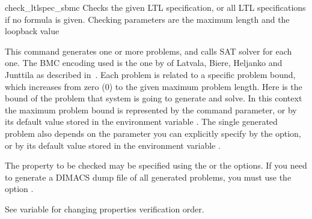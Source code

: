 \begin{nusmvCommand} {check\_ltlspec\_sbmc} {\label{checkLtlspecSbmc} 
Checks the given LTL specification, or all LTL specifications if no
formula is given.  Checking parameters are the maximum length and the
loopback value}


This command generates one or more problems, and calls SAT solver for
each one. The BMC encoding used is the one by of Latvala, Biere,
Heljanko and Junttila as described in~\cite{vmcai05}.
%
Each problem is related to a specific problem bound, which
increases from zero ($0$) to the given maximum problem length. Here
 is the bound of the problem that system is going to
generate and solve.  In this context the maximum problem bound is
represented by the  command parameter, or by its default
value stored in the environment variable .  The
single generated problem also depends on the  parameter
you can explicitly specify by the  option, or by its
default value stored in the environment variable
.

The property to be checked may be specified using the  or the  options.  If you need to generate
a DIMACS dump file of all generated problems, you must use the option
.

See variable  for changing properties
verification order.

\begin{cmdOpt}

       
            



\end{cmdOpt}
\end{nusmvCommand}
